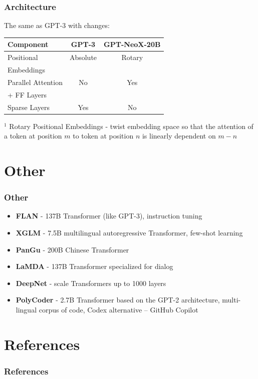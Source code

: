 \documentclass{beamer}
\begin{document}
\begin{frame}
    \frametitle{Architecture}
    The same as GPT-3 with changes:

    \begin{center}
        \begin{tabular}{ l | c | c }
        \textbf{Component} & \textbf{GPT-3} & \textbf{GPT-NeoX-20B} \\
        \hline
        Positional & Absolute & Rotary \\
        Embeddings & & \\
        \hline
        Parallel Attention & No & Yes \\
        + FF Layers & & \\
        \hline
        Sparse Layers & Yes & No \\
        \end{tabular}
    \end{center}

    $^{1}$ Rotary Positional Embeddings \cite{roformer} - twist embedding space so that the attention of a token at position $m$ to token at position $n$ is linearly dependent on $m-n$
\end{frame}




\section{Other}
\begin{frame}
    \frametitle{Other}
    \begin{itemize}
        \item \textbf{FLAN} \cite{flan} - 137B Transformer (like GPT-3), instruction tuning
        \item \textbf{XGLM} \cite{xglm} - 7.5B multilingual autoregressive Transformer, few-shot learning
        \item \textbf{PanGu} \cite{pangu} - 200B Chinese Transformer
        \item \textbf{LaMDA} \cite{lamda} - 137B Transformer specialized for dialog
        \item \textbf{DeepNet} \cite{deepnet} - scale Transformers up to 1000 layers
        \item \textbf{PolyCoder} \cite{polycoder} - 2.7B Transformer based on the GPT-2 architecture, multi-lingual corpus of code, Codex alternative -- GitHub Copilot
    \end{itemize}
\end{frame}





\section{References}
\begin{frame}[allowframebreaks,t]
    \tiny
    \frametitle{References}
    
    
\end{frame}
\end{document}
